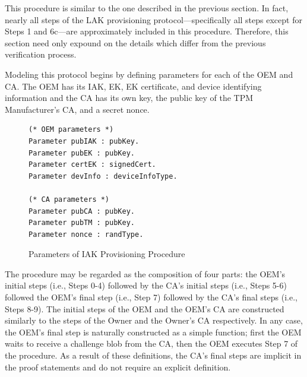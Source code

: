 \documentclass[runningheads]{llncs}
\begin{document}
This procedure is similar to the one described in the previous section. In fact, nearly all steps of the LAK provisioning protocol---specifically all steps except for Steps 1 and 6c---are approximately included in this procedure. Therefore, this section need only expound on the details which differ from the previous verification process. 

Modeling this protocol begins by defining parameters for each of the OEM and CA. The OEM has its IAK, EK, EK certificate, and device identifying information and the CA has its own key, the public key of the TPM Manufacturer's CA, and a secret nonce.
\begin{figure}[h]
\begin{lstlisting}[language=Coq]
(* OEM parameters *)
Parameter pubIAK : pubKey.
Parameter pubEK : pubKey.
Parameter certEK : signedCert.
Parameter devInfo : deviceInfoType.

(* CA parameters *)
Parameter pubCA : pubKey.
Parameter pubTM : pubKey.
Parameter nonce : randType.
\end{lstlisting}
\caption{Parameters of IAK Provisioning Procedure}
\end{figure}
The procedure may be regarded as the composition of four parts: the OEM's initial steps (i.e., Steps 0-4) followed by the CA's initial steps (i.e., Steps 5-6) followed the OEM's final step (i.e., Step 7) followed by the CA's final steps (i.e., Steps 8-9). The initial steps of the OEM and the OEM's CA are constructed similarly to the steps of the Owner and the Owner's CA respectively. In any case, the OEM's final step is naturally constructed as a simple function; first the OEM waits to receive a challenge blob from the CA, then the OEM executes Step 7 of the procedure. As a result of these definitions, the CA's final steps are implicit in the proof statements and do not require an explicit definition. 
\end{document}
